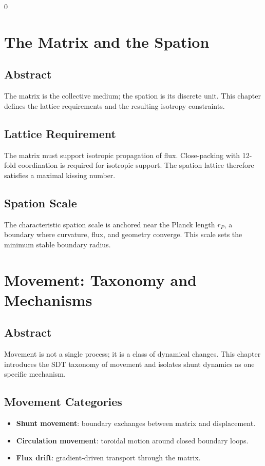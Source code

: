 0\documentclass[12pt]{book}
\begin{document}
\chapter{The Matrix and the Spation}

\section*{Abstract}
The matrix is the collective medium; the spation is its discrete unit. This chapter defines the lattice
requirements and the resulting isotropy constraints.

\section{Lattice Requirement}
The matrix must support isotropic propagation of flux. Close-packing with 12-fold coordination is
required for isotropic support. The spation lattice therefore satisfies a maximal kissing number.

\section{Spation Scale}
The characteristic spation scale is anchored near the Planck length $r_P$, a boundary where curvature,
flux, and geometry converge. This scale sets the minimum stable boundary radius.

\chapter{Movement: Taxonomy and Mechanisms}

\section*{Abstract}
Movement is not a single process; it is a class of dynamical changes. This chapter introduces the SDT
taxonomy of movement and isolates shunt dynamics as one specific mechanism.

\section{Movement Categories}
\begin{itemize}
\item \textbf{Shunt movement}: boundary exchanges between matrix and displacement.
\item \textbf{Circulation movement}: toroidal motion around closed boundary loops.
\item \textbf{Flux drift}: gradient-driven transport through the matrix.
\end{itemize}
\end{document}
